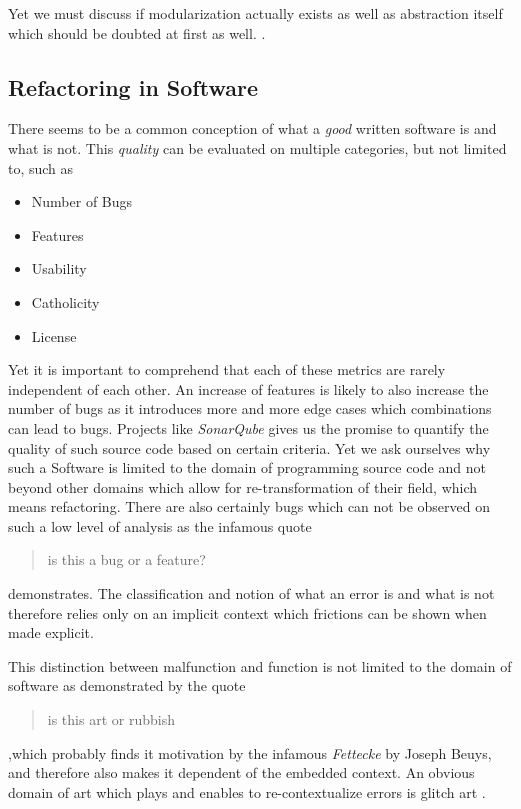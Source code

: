 \documentclass[10pt,twocolumn,letterpaper]{article}
\begin{document}
Yet we must discuss if modularization actually exists as well as abstraction itself which should be doubted at first as well. \cite{Teil_Latour_1995}.

\subsection{Refactoring in Software}

There seems to be a common conception of what a \textit{good} written software is and what is not.
This \textit{quality} can be evaluated on multiple categories, but not limited to, such as

\begin{itemize}
    \itemsep0em
    \item Number of Bugs
    \item Features
    \item Usability
    \item Catholicity
    \item License
\end{itemize}

Yet it is important to comprehend that each of these metrics are rarely independent of each other.
An increase of features is likely to also increase the number of bugs as it introduces more and more edge cases which combinations can lead to bugs.
Projects like \textit{SonarQube} gives us the promise to quantify the quality of such source code based on certain criteria.
Yet we ask ourselves why such a Software is limited to the domain of programming source code and not beyond other domains which allow for re-transformation of their field, which means refactoring.
There are also certainly bugs which can not be observed on such a low level of analysis as the infamous quote
\begin{quote}
    is this a bug or a feature?
\end{quote}
demonstrates.
The classification and notion of what an error is and what is not therefore relies only on an implicit context which frictions can be shown when made explicit.

This distinction between malfunction and function is not limited to the domain of software as demonstrated by the quote
\begin{quote}
    is this art or rubbish
\end{quote}
,which probably finds it motivation by the infamous \textit{Fettecke} by Joseph Beuys, and therefore also makes it dependent of the embedded context.
An obvious domain of art which plays and enables to re-contextualize errors is glitch art \cite{Schubert_2019}.
\end{document}

